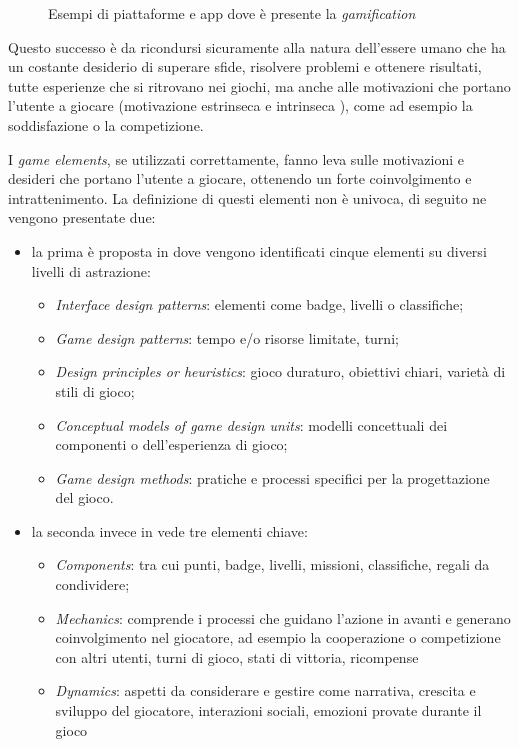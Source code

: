 \begin{figure}
{        \label{fig:waze-level}
    }
    \caption{Esempi di piattaforme e app dove è presente la \textit{gamification}} 
    \label{fig:gamification-example}
\end{figure}

Questo successo è da ricondursi sicuramente alla natura dell'essere umano che ha un costante desiderio di superare sfide, risolvere problemi e ottenere risultati, tutte esperienze che si ritrovano nei giochi, ma anche alle motivazioni che portano l'utente a giocare (motivazione estrinseca e intrinseca \cite{Deci1975IntrinsicMA}), come ad esempio la soddisfazione o la competizione.

I \textit{game elements}, se utilizzati correttamente, fanno leva sulle motivazioni e desideri che portano l'utente a giocare, ottenendo un forte coinvolgimento e intrattenimento.
La definizione di questi elementi non è univoca, di seguito ne vengono presentate due:

\begin{itemize}
    \itemsep1em
    \item la prima è proposta in \cite{definingGamification2011} dove vengono identificati cinque elementi su diversi livelli di astrazione:
    \begin{itemize}
        \item \emph{Interface design patterns}: elementi come badge, livelli o classifiche;
        \item \emph{Game design patterns}: tempo e/o risorse limitate, turni;
        \item \emph{Design principles or heuristics}: gioco duraturo, obiettivi chiari, varietà di stili di gioco;
        \item \emph{Conceptual models of game design units}: modelli concettuali dei componenti o dell'esperienza di gioco;
        \item \emph{Game design methods}: pratiche e processi specifici per la progettazione del gioco.
    \end{itemize}
    \item la seconda invece in \cite{Werbach2012ForTW} vede tre elementi chiave:
    \begin{itemize}
        \item \emph{Components}: tra cui punti, badge, livelli, missioni, classifiche, regali da condividere;
        \item \emph{Mechanics}: comprende i processi che guidano l'azione in avanti e generano coinvolgimento nel giocatore, ad esempio la cooperazione o competizione con altri utenti, turni di gioco, stati di vittoria, ricompense
        \item \emph{Dynamics}: aspetti da considerare e gestire come narrativa, crescita e sviluppo del giocatore, interazioni sociali, emozioni provate durante il gioco
    \end{itemize}
\end{itemize}


